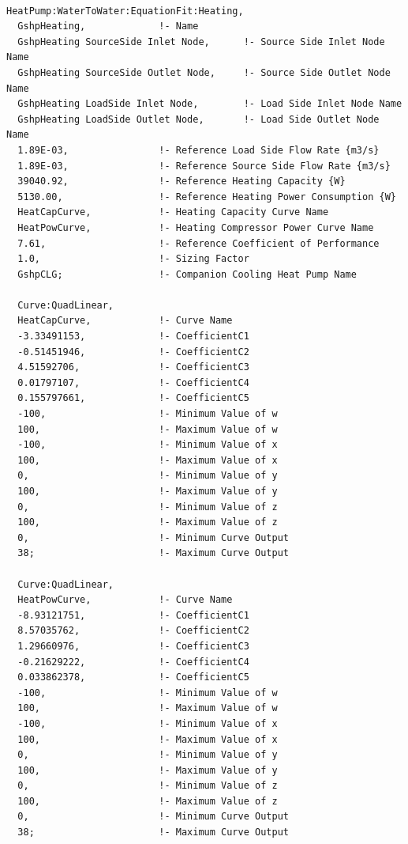 \begin{lstlisting}

HeatPump:WaterToWater:EquationFit:Heating,
  GshpHeating,             !- Name
  GshpHeating SourceSide Inlet Node,      !- Source Side Inlet Node Name
  GshpHeating SourceSide Outlet Node,     !- Source Side Outlet Node Name
  GshpHeating LoadSide Inlet Node,        !- Load Side Inlet Node Name
  GshpHeating LoadSide Outlet Node,       !- Load Side Outlet Node Name
  1.89E-03,                !- Reference Load Side Flow Rate {m3/s}
  1.89E-03,                !- Reference Source Side Flow Rate {m3/s}
  39040.92,                !- Reference Heating Capacity {W}
  5130.00,                 !- Reference Heating Power Consumption {W}
  HeatCapCurve,            !- Heating Capacity Curve Name
  HeatPowCurve,            !- Heating Compressor Power Curve Name
  7.61,                    !- Reference Coefficient of Performance
  1.0,                     !- Sizing Factor
  GshpCLG;                 !- Companion Cooling Heat Pump Name

  Curve:QuadLinear,
  HeatCapCurve,            !- Curve Name
  -3.33491153,             !- CoefficientC1
  -0.51451946,             !- CoefficientC2
  4.51592706,              !- CoefficientC3
  0.01797107,              !- CoefficientC4
  0.155797661,             !- CoefficientC5
  -100,                    !- Minimum Value of w
  100,                     !- Maximum Value of w
  -100,                    !- Minimum Value of x
  100,                     !- Maximum Value of x
  0,                       !- Minimum Value of y
  100,                     !- Maximum Value of y
  0,                       !- Minimum Value of z
  100,                     !- Maximum Value of z
  0,                       !- Minimum Curve Output
  38;                      !- Maximum Curve Output

  Curve:QuadLinear,
  HeatPowCurve,            !- Curve Name
  -8.93121751,             !- CoefficientC1
  8.57035762,              !- CoefficientC2
  1.29660976,              !- CoefficientC3
  -0.21629222,             !- CoefficientC4
  0.033862378,             !- CoefficientC5
  -100,                    !- Minimum Value of w
  100,                     !- Maximum Value of w
  -100,                    !- Minimum Value of x
  100,                     !- Maximum Value of x
  0,                       !- Minimum Value of y
  100,                     !- Maximum Value of y
  0,                       !- Minimum Value of z
  100,                     !- Maximum Value of z
  0,                       !- Minimum Curve Output
  38;                      !- Maximum Curve Output
\end{lstlisting}

